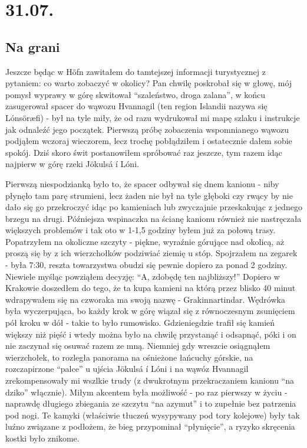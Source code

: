 \chapter*{31.07.}

\section*{Na grani}

Jeszcze będąc w Höfn zawitałem do tamtejszej informacji turystycznej z pytaniem: co warto zobaczyć w okolicy? Pan chwilę poskrobał się w głowę, mój pomysł wyprawy w górę  skwitował “szaleństwo, droga zalana”, w końcu zasugerował spacer do wąwozu Hvannagil (ten region Islandii nazywa się Lónsöræfi) - był na tyle miły, że od razu wydrukował mi mapę szlaku i instrukcje jak odnaleźć jego początek. Pierwszą próbę zobaczenia wspomnianego wąwozu podjąłem wczoraj wieczorem, lecz trochę pobłądziłem i ostatecznie dałem sobie spokój. Dziś skoro świt postanowiłem spróbować raz jeszcze, tym razem idąc najpierw w górę rzeki Jökulsá í Lóni.

Pierwszą niespodzianką było to, że spacer odbywał się dnem kanionu - niby płynęło tam parę strumieni, lecz żaden nie był na tyle głęboki czy rwący by nie dało się go przekroczyć idąc po kamieniach lub zwyczajnie przeskakując z jednego brzegu na drugi. Późniejsza wspinaczka na ścianę kanionu również nie nastręczała większych problemów i tak oto w 1-1,5 godziny byłem już za połową trasy. Popatrzyłem na okoliczne szczyty - piękne, wyraźnie górujące nad okolicą, aż proszą się by z ich wierzchołków podziwiać ziemię u stóp. Spojrzałem na zegarek - była 7:30, reszta towarzystwa obudzi się pewnie dopiero za ponad 2 godziny. Niewiele myśląc powziąłem decyzję: “A, zdobędę ten najbliższy!” Dopiero w Krakowie doszedłem do tego, że ta kupa kamieni na którą przez blisko 40 minut wdrapywałem się na czworaka ma swoją nazwę - Grakinnartindar. Wędrówka była wyczerpująca, bo każdy krok w górę wiązał się z równoczesnym zsunięciem pół kroku w dół - takie to było rumowisko. Gdzieniegdzie trafił się kamień większy niż pięść i wtedy można było na chwilę przystanąć i odsapnąć, póki i on nie zaczynał się osuwać razem ze mną. Niemniej gdy wreszcie osiągnąłem wierzchołek, to rozległa panorama na ośnieżone łańcuchy górskie, na rozczapirzone “palce” u ujścia Jökulsá í Lóni i na wąwóz Hvannagil zrekompensowały mi wszlkie trudy (z dwukrotnym przekraczaniem kanionu “na dziko” włącznie). Miłym akcentem była możliwość - po raz pierwszy w życiu - naprawdę długiego zbiegania ze szczytu “na azymut” i to zupełnie bez patrzenia pod nogi. Te kamyki (właściwie tłuczeń wysypywany pod tory kolejowe) były tak luźno związane z podłożem, że bieg przypominał “płynięcie”, a ryzyko skręcenia kostki było znikome.


